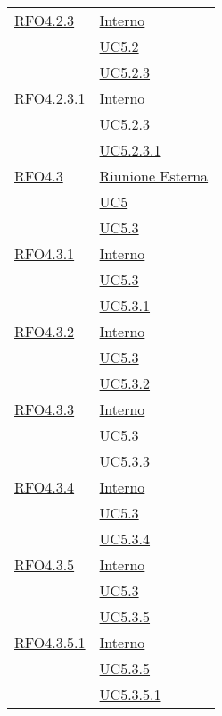 \begin{longtable}{|>{\centering}m{5cm}|m{5cm}<{\centering}|}
\hyperlink{RFO4.2.3}{RFO4.2.3} & \hyperlink{Interno}{Interno}\\
& \hyperref[UC5.2]{UC5.2}\\
& \hyperref[UC5.2.3]{UC5.2.3}\\ \hline

\hyperlink{RFO4.2.3.1}{RFO4.2.3.1} & \hyperlink{Interno}{Interno}\\
& \hyperref[UC5.2.3]{UC5.2.3}\\
& \hyperref[UC5.2.3.1]{UC5.2.3.1}\\ \hline

\hyperlink{RFO4.3}{RFO4.3} & \hyperlink{Riunione Esterna}{Riunione Esterna}\\
& \hyperref[UC5]{UC5}\\
& \hyperref[UC5.3]{UC5.3}\\ \hline

\hyperlink{RFO4.3.1}{RFO4.3.1} & \hyperlink{Interno}{Interno}\\
& \hyperref[UC5.3]{UC5.3}\\
& \hyperref[UC5.3.1]{UC5.3.1}\\ \hline

\hyperlink{RFO4.3.2}{RFO4.3.2} & \hyperlink{Interno}{Interno}\\
& \hyperref[UC5.3]{UC5.3}\\
& \hyperref[UC5.3.2]{UC5.3.2}\\ \hline

\hyperlink{RFO4.3.3}{RFO4.3.3} & \hyperlink{Interno}{Interno}\\
& \hyperref[UC5.3]{UC5.3}\\
& \hyperref[UC5.3.3]{UC5.3.3}\\ \hline

\hyperlink{RFO4.3.4}{RFO4.3.4} & \hyperlink{Interno}{Interno}\\
& \hyperref[UC5.3]{UC5.3}\\
& \hyperref[UC5.3.4]{UC5.3.4}\\ \hline

\hyperlink{RFO4.3.5}{RFO4.3.5} & \hyperlink{Interno}{Interno}\\
& \hyperref[UC5.3]{UC5.3}\\
& \hyperref[UC5.3.5]{UC5.3.5}\\ \hline

\hyperlink{RFO4.3.5.1}{RFO4.3.5.1} & \hyperlink{Interno}{Interno}\\
& \hyperref[UC5.3.5]{UC5.3.5}\\
& \hyperref[UC5.3.5.1]{UC5.3.5.1}\\ \hline


\end{longtable}
